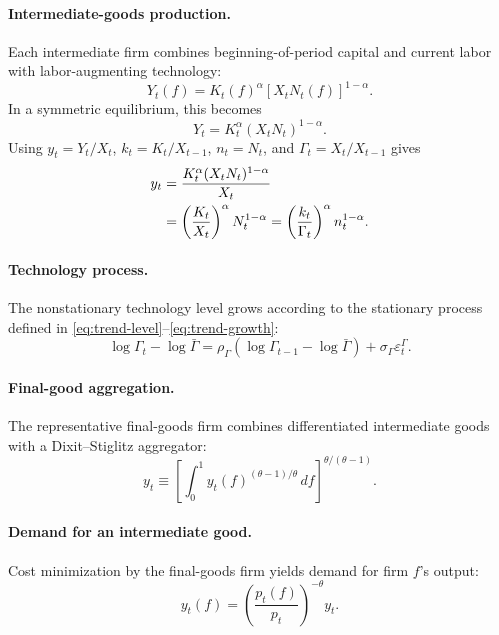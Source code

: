 \documentclass[12pt,final]{article}
\begin{document}
\paragraph{Intermediate-goods production.}
Each intermediate firm combines beginning-of-period capital and current labor
with labor-augmenting technology:
\begin{equation}
  Y_t(f)=K_t(f)^{\alpha}\left[X_tN_t(f)\right]^{1-\alpha}.
  \label{eq:firm-production}
\end{equation}
In a symmetric equilibrium, this becomes
\begin{equation}
  Y_t=K_t^{\alpha}(X_tN_t)^{1-\alpha}.
  \label{eq:aggregate-production}
\end{equation}
Using $y_t=Y_t/X_t$, $k_t=K_t/X_{t-1}$,
$n_t=N_t$, and $\Gamma_t=X_t/X_{t-1}$ gives
\begin{align}
  y_t
   & =\frac{K_t^{\alpha}(X_tN_t)^{1-\alpha}}{X_t} \notag  \\
   & =\left(\frac{K_t}{X_t}\right)^{\alpha}N_t^{1-\alpha}
  =\left(\frac{k_t}{\Gamma_t}\right)^{\alpha}n_t^{1-\alpha}.
  \label{eq:stationary-production}
\end{align}

\paragraph{Technology process.}
The nonstationary technology level grows according to the stationary process
defined in \eqref{eq:trend-level}--\eqref{eq:trend-growth}:
\begin{equation}
  \log\Gamma_t-\log\bar\Gamma
  =\rho_\Gamma(\log\Gamma_{t-1}-\log\bar\Gamma)
  +\sigma_\Gamma\varepsilon_t^\Gamma.
  \label{eq:technology}
\end{equation}

\paragraph{Final-good aggregation.}
The representative final-goods firm combines differentiated intermediate goods with a Dixit--Stiglitz aggregator:
\begin{equation}
  y_t
  \equiv
  \left[
    \int_0^1 y_t(f)^{(\theta-1)/\theta}\,df
    \right]^{\theta/(\theta-1)}.
  \label{eq:final-good}
\end{equation}

\paragraph{Demand for an intermediate good.}
Cost minimization by the final-goods firm yields demand for firm $f$'s output:
\begin{equation}
  y_t(f)=\left(\frac{p_t(f)}{p_t}\right)^{-\theta}y_t.
  \label{eq:firm-demand}
\end{equation}
\end{document}
